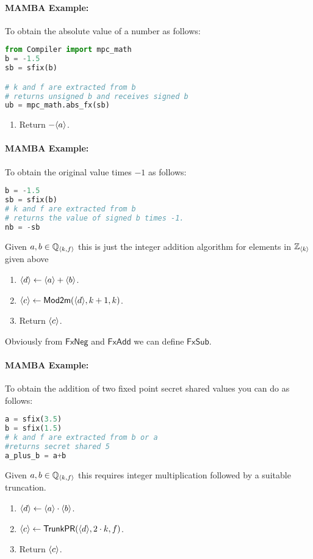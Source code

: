 \paragraph{MAMBA Example:} To obtain the absolute value of a number as follows: 
\begin{lstlisting}[language={python}]
from Compiler import mpc_math
b = -1.5
sb = sfix(b)

# k and f are extracted from b
# returns unsigned b and receives signed b
ub = mpc_math.abs_fx(sb)
\end{lstlisting}

\begin{enumerate}
\item Return $-\langle a \rangle$.
\end{enumerate}
\paragraph{MAMBA Example:} To obtain the original value times $-1$ as follows: 
\begin{lstlisting}[language={python}]
b = -1.5
sb = sfix(b)
# k and f are extracted from b
# returns the value of signed b times -1.
nb = -sb
\end{lstlisting}
Given $a, b \in {\mathbb{Q}}_{\langle k, f \rangle}$ this is just the integer addition algorithm for elements
in ${\mathbb{Z}}_{\langle k \rangle}$ given above
\begin{enumerate}
\item $\langle d \rangle \leftarrow \langle a \rangle + \langle b \rangle$.
\item $\langle c \rangle \leftarrow \mathsf{Mod2m}(\langle d \rangle,k+1,k)$.
\item Return $\langle c \rangle$.
\end{enumerate}
Obviously from $\mathsf{FxNeg}$ and $\mathsf{FxAdd}$ we can define $\mathsf{FxSub}$.
\paragraph{MAMBA Example:} To obtain the addition of two fixed point secret shared values you can do as follows:
\begin{lstlisting}[language={python}]
a = sfix(3.5)
b = sfix(1.5)
# k and f are extracted from b or a
#returns secret shared 5
a_plus_b = a+b
\end{lstlisting}
Given $a, b \in {\mathbb{Q}}_{\langle k, f \rangle}$ this requires integer multiplication followed
by a suitable truncation.
\begin{enumerate}
\item $\langle d \rangle \leftarrow \langle a \rangle \cdot \langle b \rangle$.
\item $\langle c \rangle \leftarrow \mathsf{TrunkPR}(\langle d \rangle,2 \cdot k,f)$.
\item Return $\langle c \rangle$.
\end{enumerate}
